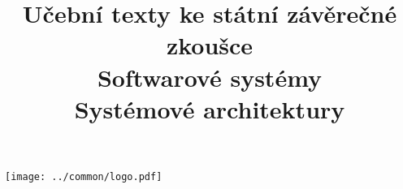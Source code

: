 \clearpage

\clearpage

\title{\LARGE Učební texty ke státní závěrečné zkoušce \\ Softwarové systémy \\ Systémové architektury}




\maketitle

\vspace{10mm}
\begin{center}
\texttt{[image: ../common/logo.pdf]}
\end{center} 

\clearpage

\clearpage

\tableofcontents







